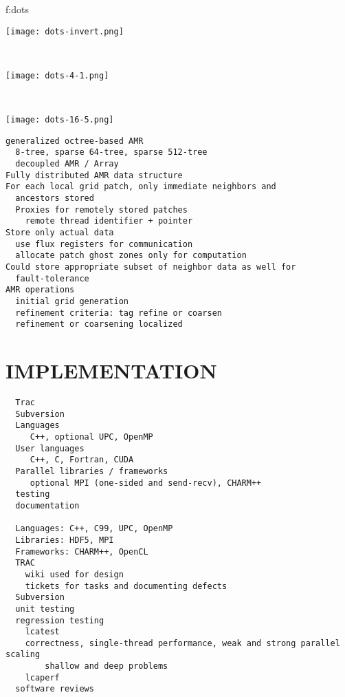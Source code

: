 \documentclass[14pt,letter]{article}
\begin{document}
{f:dots}{
\begin{minipage}{7.0in}
\begin{minipage}{2.2in}
\texttt{[image: dots-invert.png]}
\end{minipage} \ 
\begin{minipage}{2.2in}
\texttt{[image: dots-4-1.png]}
\end{minipage} \ 
\begin{minipage}{2.2in}
\texttt{[image: dots-16-5.png]}
\end{minipage}
\end{minipage}}

\begin{verbatim}
generalized octree-based AMR 
  8-tree, sparse 64-tree, sparse 512-tree
  decoupled AMR / Array
Fully distributed AMR data structure
For each local grid patch, only immediate neighbors and
  ancestors stored
  Proxies for remotely stored patches
    remote thread identifier + pointer
Store only actual data
  use flux registers for communication
  allocate patch ghost zones only for computation
Could store appropriate subset of neighbor data as well for
  fault-tolerance
AMR operations
  initial grid generation
  refinement criteria: tag refine or coarsen
  refinement or coarsening localized
\end{verbatim}


\section{IMPLEMENTATION} \label{s:implementation}


\begin{verbatim}
  Trac
  Subversion
  Languages
     C++, optional UPC, OpenMP
  User languages
     C++, C, Fortran, CUDA
  Parallel libraries / frameworks
     optional MPI (one-sided and send-recv), CHARM++
  testing
  documentation

  Languages: C++, C99, UPC, OpenMP
  Libraries: HDF5, MPI
  Frameworks: CHARM++, OpenCL
  TRAC
    wiki used for design
    tickets for tasks and documenting defects
  Subversion
  unit testing
  regression testing
    lcatest
    correctness, single-thread performance, weak and strong parallel scaling
        shallow and deep problems
    lcaperf
  software reviews
\end{verbatim}
  
\end{document}
